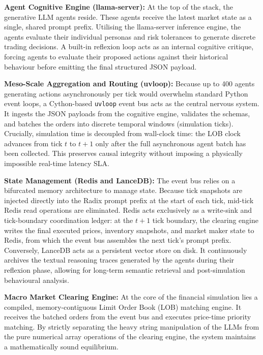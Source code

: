 \documentclass[10pt,a4paper]{article}
\begin{document}
\textbf{Agent Cognitive Engine (llama-server):} At the top of the stack, the generative LLM agents reside. These agents receive the latest market state as a single, shared prompt prefix. Utilising the llama-server inference engine, the agents evaluate their individual personas and risk tolerances to generate discrete trading decisions. A built-in reflexion loop acts as an internal cognitive critique, forcing agents to evaluate their proposed actions against their historical behaviour before emitting the final structured JSON payload.

\textbf{Meso-Scale Aggregation and Routing (uvloop):} Because up to 400 agents generating actions asynchronously per tick would overwhelm standard Python event loops, a Cython-based \texttt{uvloop} event bus acts as the central nervous system. It ingests the JSON payloads from the cognitive engine, validates the schemas, and batches the orders into discrete temporal windows (simulation ticks). Crucially, simulation time is decoupled from wall-clock time: the LOB clock advances from tick $t$ to $t+1$ only after the full asynchronous agent batch has been collected. This preserves causal integrity without imposing a physically impossible real-time latency SLA.

\textbf{State Management (Redis and LanceDB):} The event bus relies on a bifurcated memory architecture to manage state. Because tick snapshots are injected directly into the Radix prompt prefix at the start of each tick, mid-tick Redis read operations are eliminated. Redis acts exclusively as a write-sink and tick-boundary coordination ledger: at the $t+1$ tick boundary, the clearing engine writes the final executed prices, inventory snapshots, and market maker state to Redis, from which the event bus assembles the next tick's prompt prefix. Conversely, LanceDB acts as a persistent vector store on disk. It continuously archives the textual reasoning traces generated by the agents during their reflexion phase, allowing for long-term semantic retrieval and post-simulation behavioural analysis.

\textbf{Macro Market Clearing Engine:} At the core of the financial simulation lies a compiled, memory-contiguous Limit Order Book (LOB) matching engine. It receives the batched orders from the event bus and executes price-time priority matching. By strictly separating the heavy string manipulation of the LLMs from the pure numerical array operations of the clearing engine, the system maintains a mathematically sound equilibrium. 
\end{document}
